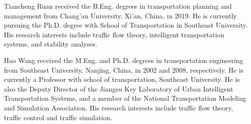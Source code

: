 \documentclass[journal]{IEEEtran}
\begin{document}



\begin{IEEEbiography}{Tiancheng Ruan}
  received the B.Eng. degrees in transportation planning and management from Chang'an University, Xi'an, China, in 2019. He is currently pursuing the Ph.D. degree with School of Transportation in Southeast University. His research interests include traffic flow theory, intelligent transportation systems, and stability analyses.
\end{IEEEbiography}

\begin{IEEEbiography}{Hao Wang}
  received the M.Eng. and Ph.D. degrees in transportation engineering from Southeast University, Nanjing, China, in 2002 and 2008, respectively. He is currently a Professor with school of transportation, Southeast University. He is also the Deputy Director of the Jiangsu Key Laboratory of Urban Intelligent Transportation Systems, and a member of the National Transportation Modeling and Simulation Association. His research interests include traffic flow theory, traffic control and traffic simulation.
\end{IEEEbiography}
\end{document}
